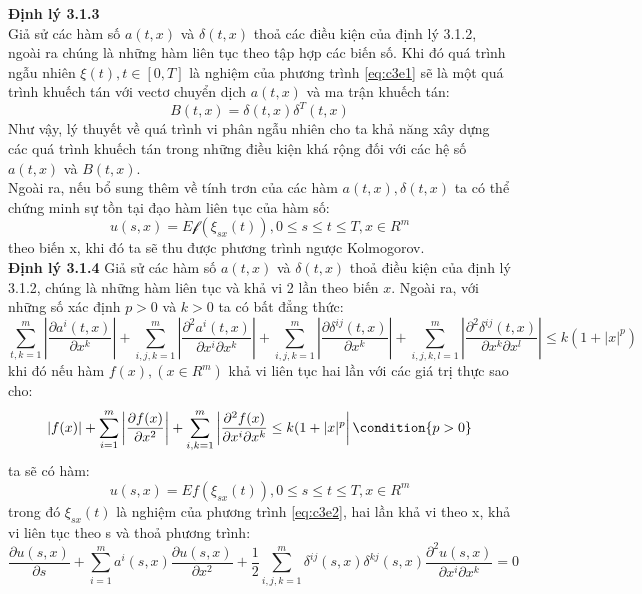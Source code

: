 \documentclass[12pt,a4paper]{article}
\begin{document}
\textbf{Định lý 3.1.3}\\
Giả sử các hàm số $a(t,x)$ và $\delta(t,x)$ thoả các điều kiện của định lý 3.1.2, ngoài ra chúng là những hàm liên tục theo tập hợp các biến số. Khi đó quá trình ngẫu nhiên $\xi(t),t\in[0,T]$ là nghiệm của phương trình \eqref{eq:c3e1} sẽ là một quá trình khuếch tán với vectơ chuyển dịch $a(t,x)$ và ma trận khuếch tán:
\begin{equation*}
	B(t,x)=\delta(t,x)\delta^T(t,x)
\end{equation*}
Như vậy, lý thuyết về quá trình vi phân ngẫu nhiên cho ta khả năng xây dựng các quá trình khuếch tán trong những điều kiện khá rộng đối với các hệ số $a(t,x)$ và $B(t,x)$.\\
Ngoài ra, nếu bổ sung thêm về tính trơn của các hàm $a(t,x),\delta(t,x)$ ta có thể chứng minh sự tồn tại đạo hàm liên tục của hàm số:
\begin{equation*}
	u(s,x)=E\mathscr{f}(\xi_{sx}(t)),0\leq s\leq t\leq T,x\in R^m
\end{equation*}
theo biến x, khi đó ta sẽ thu được phương trình ngược Kolmogorov.\\
\textbf{Định lý 3.1.4}
Giả sử các hàm số $a(t,x)$ và $\delta(t,x)$ thoả điều kiện của định lý 3.1.2, chúng là những hàm liên tục và khả vi 2 lần theo biến $x$. Ngoài ra, với những số xác định $p>0$ và $k>0$ ta có bất đẳng thức:
\begin{dmath*}
	\sum\limits_{t,k=1}^{m}\left|\dfrac{\partial a^i(t,x)}{\partial x^k}\right|+\sum\limits_{i,j,k=1}^{m}\left|\dfrac{\partial^2a^i(t,x)}{\partial x^i\partial x^k}\right|+\sum_{i,j,k=1}^{m}\left|\dfrac{\partial\delta^{ij}(t,x)}{\partial x^k} \right|+\sum_{i,j,k,l=1}^{m}\left|\dfrac{\partial^2\delta^{ij}(t,x)}{\partial x^k\partial x^l} \right|\leq k(1+|x|^p)	
\end{dmath*}
khi đó nếu hàm $f(x),(x\in R^m)$ khả vi liên tục hai lần với các giá trị thực sao cho:
\begin{equation*}
	\left|f(x)\right|+\sum_{i=1}^{m}\left|\dfrac{\partial f(x)}{\partial x^2} \right|+\sum_{i,k=1}^{m}\left|\dfrac{\partial^2f(x)}{\partial x^i \partial x^k}\leq k(1+|x|^p \right| \condition{p>0}
\end{equation*}
ta sẽ có hàm:
\begin{equation*}
	u(s,x)=Ef(\xi_{sx}(t)),0\leq s\leq t \leq T,x\in R^m
\end{equation*}
trong đó $\xi_{sx}(t)$ là nghiệm của phương trình \eqref{eq:c3e2}, hai lần khả vi theo x, khả vi liên tục theo s và thoả phương trình:
\begin{equation*}
	\dfrac{\partial u(s,x)}{\partial s}+\sum_{i=1}^{m}a^i(s,x)\dfrac{\partial u(s,x)}{\partial x^2}+\dfrac{1}{2}\sum_{i,j,k=1}^{m}\delta^{ij}(s,x)\delta^{kj}(s,x)\dfrac{\partial^2u(s,x)}{\partial x^i\partial x^k}=0
\end{equation*}
\end{document}
